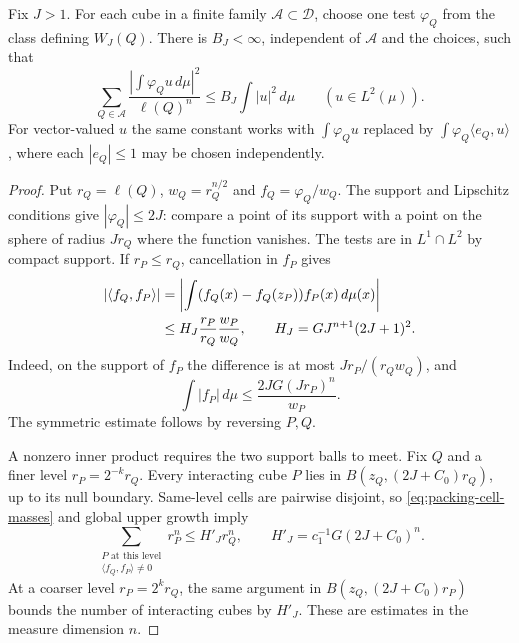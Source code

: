 \begin{lemma}\label{lem:dyadic-test-bessel}
Fix $J>1$. For each cube in a finite family $\mathcal A\subset\mathcal D$,
choose one test $\varphi_Q$ from the class defining $W_J(Q)$. There is
$B_J<\infty$, independent of $\mathcal A$ and the choices, such that
\begin{equation}\label{eq:dyadic-test-bessel}
 \sum_{Q\in\mathcal A}
 \frac{\left|\int\varphi_Q u\,d\mu\right|^2}{\ell(Q)^n}
 \le B_J\int |u|^2\,d\mu\qquad(u\in L^2(\mu)).
\end{equation}
For vector-valued $u$ the same constant works with
$\int\varphi_Q u$ replaced by
$\int\varphi_Q\langle e_Q,u\rangle$, where each $|e_Q|\le1$ may be chosen
independently.
\end{lemma}

\begin{proof}
Put $r_Q=\ell(Q)$, $w_Q=r_Q^{n/2}$ and $f_Q=\varphi_Q/w_Q$.
The support and Lipschitz conditions give $|\varphi_Q|\le2J$: compare a
point of its support with a point on the sphere of radius $Jr_Q$ where
the function vanishes. The tests are in $L^1\cap L^2$ by compact support.
If $r_P\le r_Q$, cancellation in $f_P$ gives
\begin{align}
 |\langle f_Q,f_P\rangle|
 &=\left|\int(f_Q(x)-f_Q(z_P))f_P(x)\,d\mu(x)\right|\notag\\
 &\le H_J\frac{r_P}{r_Q}\frac{w_P}{w_Q},
 \qquad H_J=GJ^{n+1}(2J+1)^2.
 \label{eq:gram-cancellation}
\end{align}
Indeed, on the support of $f_P$ the difference is at most
$Jr_P/(r_Qw_Q)$, and
\[
 \int|f_P|\,d\mu\le \frac{2JG(Jr_P)^n}{w_P}.
\]
The symmetric estimate follows by reversing $P,Q$.

A nonzero inner product requires the two support balls to meet. Fix
$Q$ and a finer level $r_P=2^{-k}r_Q$. Every interacting cube $P$ lies
in $B(z_Q,(2J+C_0)r_Q)$, up to its null boundary. Same-level cells are
pairwise disjoint, so \eqref{eq:packing-cell-masses} and global upper
growth imply
\begin{equation}\label{eq:gram-fine-mass}
 \sum_{\substack{P\text{ at this level}\\
                  \langle f_Q,f_P\rangle\ne0}}r_P^n
 \le H'_J r_Q^n,
 \qquad H'_J=c_1^{-1}G(2J+C_0)^n.
\end{equation}
At a coarser level $r_P=2^kr_Q$, the same argument in
$B(z_Q,(2J+C_0)r_P)$ bounds the number of interacting cubes by $H'_J$.
These are estimates in the measure dimension $n$.


\end{proof}
